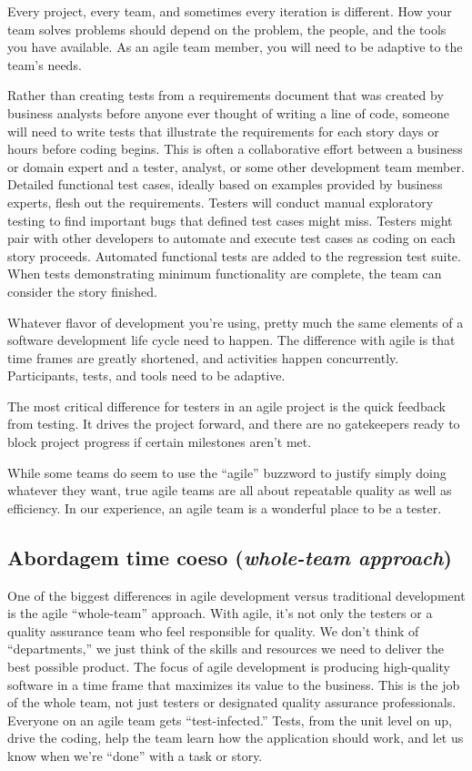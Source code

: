 \documentclass[
	12pt,				%
	openright,			%
	oneside,			%
	a4paper,			%
	english,			%
	brazil,				%
	]{abntex2}
\begin{document}
Every project, every team, and sometimes every iteration is different. How your team solves problems should depend on the problem, the people, and the tools you have available. As an agile team member, you will need to be adaptive to the team’s needs.

Rather than creating tests from a requirements document that was created by business analysts before anyone ever thought of writing a line of code, someone will need to write tests that illustrate the requirements for each story days or hours before coding begins. This is often a collaborative effort between a business or domain expert and a tester, analyst, or some other development team member. Detailed functional test cases, ideally based on examples provided by business experts, flesh out the requirements. Testers will conduct manual exploratory testing to find important bugs that defined test cases might miss. Testers might pair with other developers to automate and execute test cases as coding on each story proceeds. Automated functional tests are added to the regression test suite. When tests demonstrating minimum functionality are complete, the team can consider the story finished.

Whatever flavor of development you’re using, pretty much the same elements of a software development life cycle need to happen. The difference with agile is that time frames are greatly shortened, and activities happen concurrently. Participants, tests, and tools need to be adaptive.

The most critical difference for testers in an agile project is the quick feedback from testing. It drives the project forward, and there are no gatekeepers ready to block project progress if certain milestones aren’t met.

While some teams do seem to use the “agile” buzzword to justify simply doing whatever they want, true agile teams are all about repeatable quality as well as efficiency. In our experience, an agile team is a wonderful place to be a tester.

\subsection{Abordagem time coeso (\emph{whole-team approach})}

One of the biggest differences in agile development versus traditional development is the agile “whole-team” approach. With agile, it’s not only the testers or a quality assurance team who feel responsible for quality. We don’t think of “departments,” we just think of the skills and resources we need to deliver the best possible product. The focus of agile development is producing high-quality software in a time frame that maximizes its value to the business. This is the job of the whole team, not just testers or designated quality assurance professionals. Everyone on an agile team gets “test-infected.” Tests, from the unit level on up, drive the coding, help the team learn how the application should work, and let us know when we’re “done” with a task or story.
\end{document}
